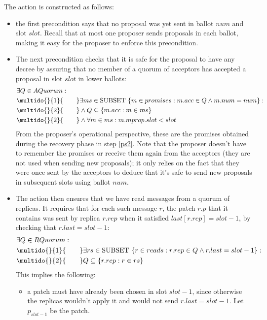 \documentclass[12pt,a4paper,en]{pracamgr}
\newcommand{\ind}[1]{\multido{}{#1}{\qquad}}
\begin{document}
The action is constructed as follows:
\begin{itemize}
    \item the first precondition says that no proposal was yet sent in ballot $num$ and slot $slot$. Recall that at most one proposer sends proposals in each ballot, making it easy for the proposer to enforce this precondition.
    \item The next precondition checks that it is safe for the proposal to have any decree by assuring that no member of a quorum of acceptors has accepted a proposal in slot $slot$ in lower ballots:
        \begin{align*}
            & \exists Q \in AQuorum:\\
            & \ind{1} \exists ms \in \text{SUBSET}\ \{m \in promises: m.acc \in Q \land m.num = num\}:\\
            & \ind{2} \land Q \subseteq \{m.acc: m \in ms\}\\
            & \ind{2} \land \forall m \in ms: m.mprop.slot < slot
        \end{align*}
        From the proposer's operational perspective, these are the promises obtained during the recovery phase in step \ref{ps2}. Note that the proposer doesn't have to remember the promises or receive them again from the acceptors (they are not used when sending new proposals); it only relies on the fact that they were once sent by the acceptors to deduce that it's safe to send new proposals in subsequent slots using ballot $num$.
    \item The action then ensures that we have read messages from a quorum of replicas. It requires that for each such message $r$, the patch $r.p$ that it contains was sent by replica $r.rep$ when it satisfied $last[r.rep] = slot - 1$, by checking that $r.last = slot - 1$:
        \begin{align*}
            & \exists Q \in RQuorum:\\
            & \ind{1} \exists rs \in \text{SUBSET}\ \{r \in reads: r.rep \in Q \land r.last = slot - 1\}:\\
            & \ind{2} Q \subseteq \{r.rep: r \in rs\}
        \end{align*}
        This implies the following:
        \begin{itemize}
            \item a patch must have already been chosen in slot $slot - 1$, since otherwise the replicas wouldn't apply it and would not send $r.last = slot - 1$. Let $p_{slot - 1}$ be the patch.

\end{itemize}
\end{itemize}
\end{document}
